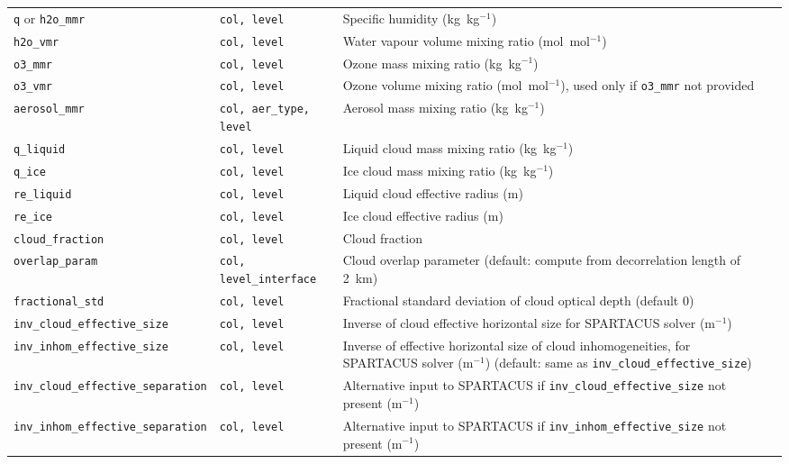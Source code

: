 \documentclass[a4,oneside]{article}
\def\codetabsize{\footnotesize}
\def\codetab#1{{\codetabsize\texttt{#1}}}
\begin{document}
\begin{center}
\begin{longtable}{llLp{6.6cm}}
\codetab{q} or \codetab{h2o\_mmr} & \codetab{col, level} & Specific humidity (kg~kg$^{-1}$)\\
\codetab{h2o\_vmr} & \codetab{col, level} & Water vapour volume mixing ratio (mol~mol$^{-1}$)\\
\codetab{o3\_mmr}& \codetab{col, level} & Ozone mass mixing ratio (kg~kg$^{-1}$)\\
\codetab{o3\_vmr} & \codetab{col, level} & Ozone volume mixing ratio (mol~mol$^{-1}$),  used only if \codetab{o3\_mmr} not provided\\
\codetab{aerosol\_mmr} & \codetab{col, aer\_type, level} & Aerosol mass mixing ratio (kg~kg$^{-1}$)\\
\codetab{q\_liquid} & \codetab{col, level} & Liquid cloud mass mixing ratio (kg~kg$^{-1}$)\\
\codetab{q\_ice} & \codetab{col, level} & Ice cloud mass mixing ratio (kg~kg$^{-1}$)\\
\codetab{re\_liquid} & \codetab{col, level} & Liquid cloud effective radius (m)\\
\codetab{re\_ice} & \codetab{col, level} & Ice cloud effective radius (m)\\
\codetab{cloud\_fraction} & \codetab{col, level} & Cloud fraction\\
\codetab{overlap\_param} & \codetab{col, level\_interface} & Cloud overlap parameter (default: compute from decorrelation length of 2~km)\\
\codetab{fractional\_std} & \codetab{col, level} & Fractional standard deviation of cloud optical depth (default 0)\\
\codetab{inv\_cloud\_effective\_size} & \codetab{col, level} & Inverse of cloud effective horizontal size for SPARTACUS solver (m$^{-1}$)\\
\codetab{inv\_inhom\_effective\_size} & \codetab{col, level} & Inverse of effective horizontal size of cloud inhomogeneities, for SPARTACUS solver (m$^{-1}$) (default: same as \codetab{inv\_cloud\_effective\_size})\\
\codetab{inv\_cloud\_effective\_separation} & \codetab{col, level} & Alternative input to SPARTACUS if \codetab{inv\_cloud\_effective\_size} not present (m$^{-1}$)\\
\codetab{inv\_inhom\_effective\_separation} & \codetab{col, level} & Alternative input to SPARTACUS if \codetab{inv\_inhom\_effective\_size} not present (m$^{-1}$)\\
\hline
\end{longtable}
\end{center}
\end{document}

